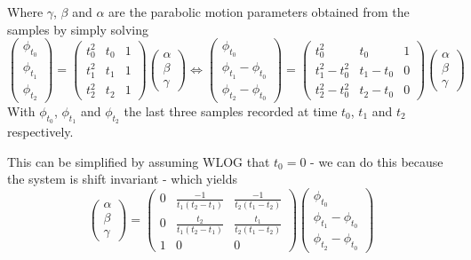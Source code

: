 \documentclass[a4paper, 10pt]{article}
\begin{document}
Where $\gamma$, $\beta$ and $\alpha$ are the parabolic motion parameters obtained from the samples by simply solving
\begin{equation}
    \begin{pmatrix}
        \phi_{t_0} \\
        \phi_{t_1} \\
        \phi_{t_2}
    \end{pmatrix}
    =
    \begin{pmatrix}
        t_0^2 & t_0 & 1 \\
        t_1^2 & t_1 & 1 \\
        t_2^2 & t_2 & 1
    \end{pmatrix}
    \begin{pmatrix}
        \alpha \\
        \beta \\
        \gamma
    \end{pmatrix}
    \iff
    \begin{pmatrix}
        \phi_{t_0} \\
        \phi_{t_1} - \phi_{t_0} \\
        \phi_{t_2} - \phi_{t_0}
    \end{pmatrix}
    =
    \begin{pmatrix}
        t_0^2         & t_0       & 1 \\
        t_1^2 - t_0^2 & t_1 - t_0 & 0 \\
        t_2^2 - t_0^2 & t_2 - t_0 & 0
    \end{pmatrix}
    \begin{pmatrix}
        \alpha \\
        \beta \\
        \gamma
    \end{pmatrix}
\end{equation}
With $\phi_{t_0}$, $\phi_{t_1}$ and $\phi_{t_2}$ the last three samples recorded at time $t_0$, $t_1$ and $t_2$ respectively.

This can be simplified by assuming WLOG that $t_0 = 0$ - we can do this because the system is shift invariant - which yields
\begin{equation}
    \begin{pmatrix}
        \alpha \\
        \beta \\
        \gamma
    \end{pmatrix}
    =
    \begin{pmatrix}
        0 & \frac{ -1}{t_1 (t_2 - t_1)} & \frac{ -1}{t_2 (t_1 - t_2)} \\
        0 & \frac{t_2}{t_1 (t_2 - t_1)} & \frac{t_1}{t_2 (t_1 - t_2)} \\
        1 & 0 & 0
    \end{pmatrix}
    \begin{pmatrix}
        \phi_{t_0} \\
        \phi_{t_1} - \phi_{t_0} \\
        \phi_{t_2} - \phi_{t_0}
    \end{pmatrix}
    \label{eqn:param_parabola}
\end{equation}
\end{document}

